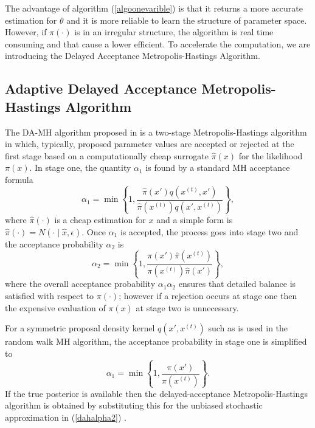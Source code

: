 The advantage of algorithm (\ref{algoonevarible}) is that it returns a more accurate estimation for $\theta$ and it is more reliable to learn the structure of parameter space. However, if $\pi(\cdot)$ is in an irregular structure, the algorithm is real time consuming and that cause a lower efficient. To accelerate the computation, we are introducing the Delayed Acceptance Metropolis-Hastings Algorithm.





\subsection{Adaptive Delayed Acceptance Metropolis-Hastings Algorithm}

The DA-MH algorithm proposed in \cite{christen2005markov} is a two-stage Metropolis-Hastings algorithm in which, typically, proposed parameter values are accepted or rejected at the first stage based on a computationally cheap surrogate $\hat{\pi}(x)$ for the likelihood $\pi(x)$. In stage one, the quantity $\alpha_1$ is found by a standard MH acceptance formula 
\begin{equation*}
\alpha_1=\min\left\lbrace  1,\frac{\hat{\pi}(x')q(x^{(t)}, x')}{\hat{\pi}(x^{(t)})q(x', x^{(t)})}  \right\rbrace ,
\end{equation*}
where $\hat{\pi}(\cdot)$ is a cheap estimation for $x$ and a simple form is $\hat{\pi}(\cdot)=N(\cdot\mid \hat{x},\epsilon)$. Once $\alpha_1$ is accepted, the process goes into stage two and the acceptance probability $\alpha_2$ is
\begin{equation}\label{dahalpha2}
\alpha_2=\min \left\lbrace  1,\frac{\pi(x')\hat{\pi}(x^{(t)}) }{\pi(x^{(t)})\hat{\pi}(x')} \right\rbrace,
\end{equation}
where the overall acceptance probability $\alpha_1\alpha_2$ ensures that detailed balance is satisfied with respect to $\pi(\cdot)$; however if a rejection occurs at stage one then the expensive evaluation of $\pi(x)$ at stage two is unnecessary.

For a symmetric proposal density kernel $q(x', x^{(t)})$ such as is used in the random walk MH algorithm, the acceptance probability in stage one is simplified to
\begin{equation} \label{dahalpha1}
\alpha_1= \min \left\lbrace 1,\frac{\pi(x')  }{\pi(x^{(t)}) }  \right\rbrace.
\end{equation}
If the true posterior is available then the delayed-acceptance Metropolis-Hastings algorithm is obtained by substituting this for the unbiased stochastic approximation in (\ref{dahalpha2}) \cite{sherlock2015efficiency}.


